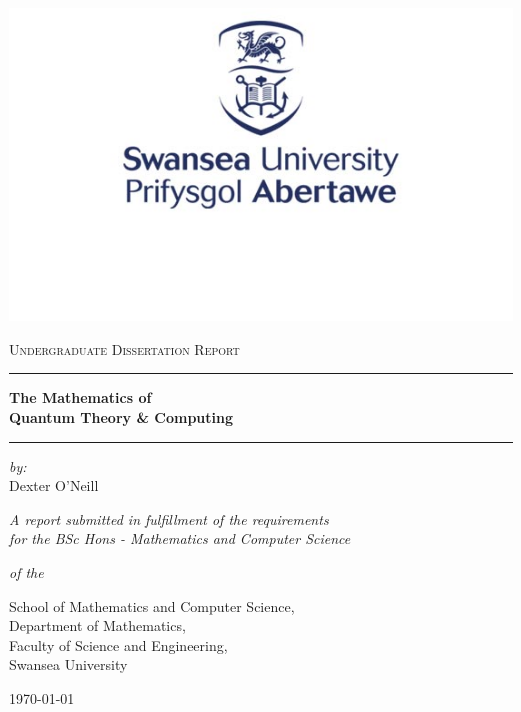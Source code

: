 \documentclass[a4paper,11pt,oneside]{book}
\begin{document}

\begin{titlepage}
\begin{center}


\includegraphics[scale=0.35]{logo} \vspace{0.5cm}

\textsc{\Large Undergraduate Dissertation Report } \vspace{0.5cm} %


\rule{14cm}{0.05cm} \vspace{0.4cm} %


\Large{\textbf{   The Mathematics of \\ Quantum Theory \& Computing  }}\vspace{0.4cm} %

\rule{14cm}{0.05cm} \vspace{1.5cm} %
 
\large{\textit{by:}} \\
\Large{Dexter O'Neill}  %

\vspace{2cm}

\large \textit{
A report submitted in fulfillment of the requirements\\ 
for the BSc Hons - Mathematics and Computer Science} 

\vspace{0.3cm} %

\textit{of the}

\vspace{0.4cm}

School of Mathematics and Computer Science,\\
Department of Mathematics,\\ 
Faculty of Science and Engineering,\\ 
Swansea University

\vspace{1.0cm} 

\today
 

\end{center}
\end{titlepage}
\end{document}

